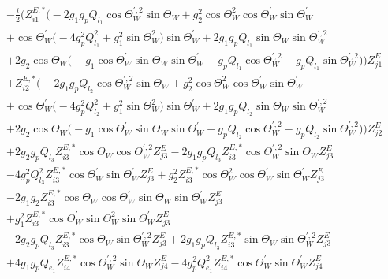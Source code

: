 \begin{align} 
 &-\frac{i}{2} \Big(Z^{E,*}_{i 1} \Big(-2 g_1 g_p Q_{l_1} \cos\Theta_{W}^{\prime,2} \sin\Theta_W  +g_{2}^{2} \cos\Theta_{W }^{2} \cos\Theta_W^{\prime}  \sin\Theta_W^{\prime}  \nonumber \\ 
 &+\cos\Theta_W^{\prime}  \Big(-4 g_{p}^{2} Q_{l_1}^{2}  + g_{1}^{2} \sin\Theta_{W }^{2} \Big)\sin\Theta_W^{\prime}  +2 g_1 g_p Q_{l_1} \sin\Theta_W  \sin\Theta_{W}^{\prime,2} \nonumber \\ 
 &+2 g_2 \cos\Theta_W  \Big(- g_1 \cos\Theta_W^{\prime}  \sin\Theta_W  \sin\Theta_W^{\prime}   + g_p Q_{l_1} \cos\Theta_{W}^{\prime,2}  - g_p Q_{l_1} \sin\Theta_{W}^{\prime,2} \Big)\Big)Z_{{j 1}}^{E} \nonumber \\ 
 &+Z^{E,*}_{i 2} \Big(-2 g_1 g_p Q_{l_2} \cos\Theta_{W}^{\prime,2} \sin\Theta_W  +g_{2}^{2} \cos\Theta_{W }^{2} \cos\Theta_W^{\prime}  \sin\Theta_W^{\prime}  \nonumber \\ 
 &+\cos\Theta_W^{\prime}  \Big(-4 g_{p}^{2} Q_{l_2}^{2}  + g_{1}^{2} \sin\Theta_{W }^{2} \Big)\sin\Theta_W^{\prime}  +2 g_1 g_p Q_{l_2} \sin\Theta_W  \sin\Theta_{W}^{\prime,2} \nonumber \\ 
 &+2 g_2 \cos\Theta_W  \Big(- g_1 \cos\Theta_W^{\prime}  \sin\Theta_W  \sin\Theta_W^{\prime}   + g_p Q_{l_2} \cos\Theta_{W}^{\prime,2}  - g_p Q_{l_2} \sin\Theta_{W}^{\prime,2} \Big)\Big)Z_{{j 2}}^{E} \nonumber \\ 
 &+2 g_2 g_p Q_{l_3} Z^{E,*}_{i 3} \cos\Theta_W  \cos\Theta_{W}^{\prime,2} Z_{{j 3}}^{E} -2 g_1 g_p Q_{l_3} Z^{E,*}_{i 3} \cos\Theta_{W}^{\prime,2} \sin\Theta_W  Z_{{j 3}}^{E} \nonumber \\ 
 &-4 g_{p}^{2} Q_{l_3}^{2} Z^{E,*}_{i 3} \cos\Theta_W^{\prime}  \sin\Theta_W^{\prime}  Z_{{j 3}}^{E} +g_{2}^{2} Z^{E,*}_{i 3} \cos\Theta_{W }^{2} \cos\Theta_W^{\prime}  \sin\Theta_W^{\prime}  Z_{{j 3}}^{E} \nonumber \\ 
 &-2 g_1 g_2 Z^{E,*}_{i 3} \cos\Theta_W  \cos\Theta_W^{\prime}  \sin\Theta_W  \sin\Theta_W^{\prime}  Z_{{j 3}}^{E} \nonumber \\ 
 &+g_{1}^{2} Z^{E,*}_{i 3} \cos\Theta_W^{\prime}  \sin\Theta_{W }^{2} \sin\Theta_W^{\prime}  Z_{{j 3}}^{E} \nonumber \\ 
 &-2 g_2 g_p Q_{l_3} Z^{E,*}_{i 3} \cos\Theta_W  \sin\Theta_{W}^{\prime,2} Z_{{j 3}}^{E} +2 g_1 g_p Q_{l_3} Z^{E,*}_{i 3} \sin\Theta_W  \sin\Theta_{W}^{\prime,2} Z_{{j 3}}^{E} \nonumber \\ 
 &+4 g_1 g_p Q_{e_{1}} Z^{E,*}_{i 4} \cos\Theta_{W}^{\prime,2} \sin\Theta_W  Z_{{j 4}}^{E} -4 g_{p}^{2} Q_{e_{1}}^{2} Z^{E,*}_{i 4} \cos\Theta_W^{\prime}  \sin\Theta_W^{\prime}  Z_{{j 4}}^{E} \nonumber \\ 

\end{align}
